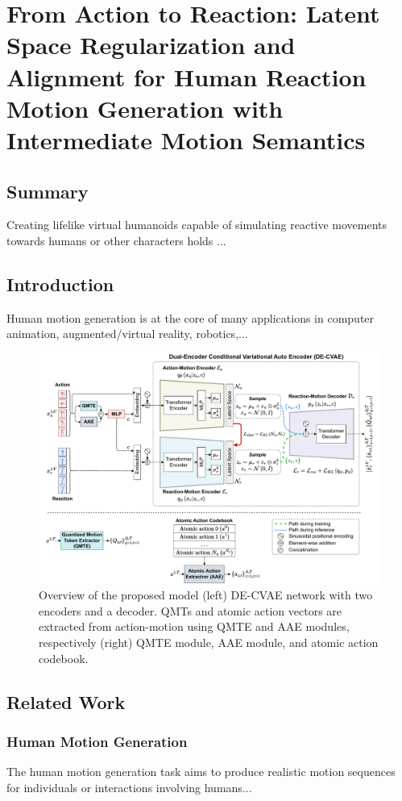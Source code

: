 
\chapter{From Action to Reaction: Latent Space Regularization and Alignment for Human Reaction Motion Generation with Intermediate Motion Semantics}

\section{Summary}
Creating lifelike virtual humanoids capable of simulating reactive movements towards humans or other characters holds ...

\section{Introduction}
Human motion generation is at the core of many applications in computer animation, augmented/virtual reality, robotics,...


\begin{figure}[t]	
	\centering
	\includegraphics[width=1\textwidth]{figures/chapter4/fig_overview}
	\caption{Overview of the proposed model (left) DE-CVAE network with two encoders and a decoder. QMTs and atomic action vectors are extracted from action-motion using QMTE and AAE modules, respectively (right) QMTE module, AAE module, and atomic action codebook.}
	\label{fig_overview}
\end{figure}


\section{Related Work}
\subsection{Human Motion Generation}
The human motion generation task aims to produce realistic motion sequences for individuals or interactions involving humans...


